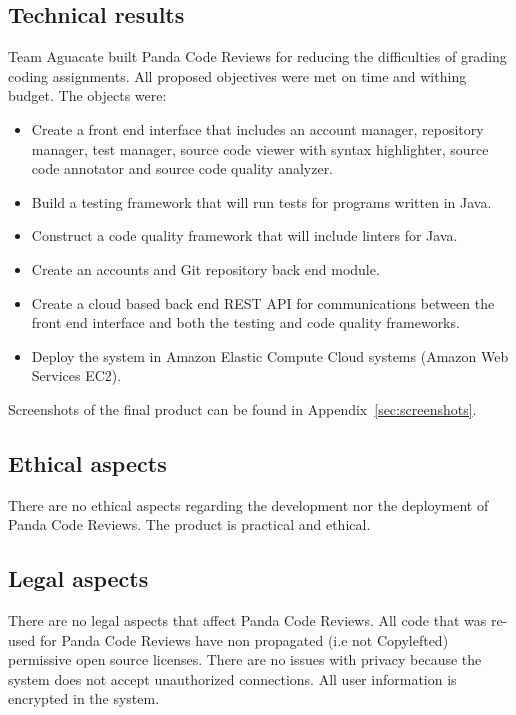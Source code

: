 \subsection{Technical results}
Team Aguacate built Panda Code Reviews for reducing the difficulties of grading coding
assignments. All proposed objectives were met on time and withing budget. The objects were:

\begin{itemize}
\item Create a front end interface that includes an account manager, repository
manager, test manager, source code viewer with syntax highlighter, source code
annotator and source code quality analyzer.

\item Build a testing framework that will run tests for programs written in
Java.

\item Construct a code quality framework that will include linters for Java.

\item Create an accounts and Git repository back end module.

\item Create a cloud based back end REST API for communications between the
front end interface and both the testing and code quality frameworks.

\item Deploy the system in Amazon Elastic Compute Cloud systems (Amazon Web
Services EC2).

\end{itemize}

Screenshots of the final product can be found in Appendix~\ref{sec:screenshots}.

\subsection{Ethical aspects}
There are no ethical aspects regarding the development nor the deployment of Panda Code Reviews. The product is practical and ethical.

\subsection{Legal aspects}
There are no legal aspects that affect Panda Code Reviews. All code that was re-used for
Panda Code Reviews have non propagated (i.e not Copylefted) permissive open source licenses.
There are no issues with privacy because the system does not accept unauthorized connections. All user information is encrypted in the system.

